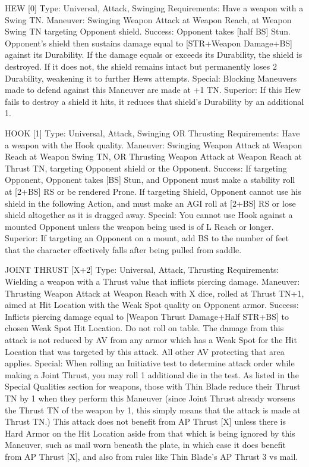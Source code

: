 \documentclass[oneside,11pt,english]{book}
\begin{document}
HEW [0] 
Type: Universal, Attack, Swinging 
Requirements: Have a weapon with a Swing TN. 
Maneuver: Swinging Weapon Attack at Weapon Reach, at Weapon Swing TN targeting Opponent shield.
Success: Opponent takes [half BS] Stun. Opponent’s shield then sustains damage equal to [STR+Weapon Damage+BS] against its Durability. If the damage equals or exceeds its Durability, the shield is destroyed. If it does not, the shield remains intact but permanently loses 2 Durability, weakening it to further Hews attempts.
Special: Blocking Maneuvers made to defend against this Maneuver are made at +1 TN. 
Superior: If this Hew fails to destroy a shield it hits, it reduces that shield’s Durability by an additional 1. 


HOOK [1] 
Type: Universal, Attack, Swinging OR Thrusting 
Requirements: Have a weapon with the Hook quality. 
Maneuver: Swinging Weapon Attack at Weapon Reach at Weapon Swing TN, OR Thrusting Weapon 
Attack at Weapon Reach at Thrust TN, targeting Opponent shield or the Opponent. 
Success: If targeting Opponent, Opponent takes [BS] Stun, and Opponent must make a stability roll at 
[2+BS] RS or be rendered Prone. 
If targeting Shield, Opponent cannot use his shield in the following Action, and must make an AGI roll at 
[2+BS] RS or lose shield altogether as it is dragged away. 
Special: You cannot use Hook against a mounted Opponent unless the weapon being used is of L Reach 
or longer. 
Superior: If targeting an Opponent on a mount, add BS to the number of feet that the character 
effectively falls after being pulled from saddle. 


JOINT THRUST [X+2] 
Type: Universal, Attack, Thrusting 
Requirements: Wielding a weapon with a Thrust value that inflicts piercing damage. 
Maneuver: Thrusting Weapon Attack at Weapon Reach with X dice, rolled at Thrust TN+1, aimed at Hit 
Location with the Weak Spot quality on Opponent armor. 
Success: Inflicts piercing damage equal to [Weapon Thrust Damage+Half STR+BS] to chosen Weak Spot 
Hit Location. Do not roll on table. The damage from this attack is not reduced by AV from any armor 
which has a Weak Spot for the Hit Location that was targeted by this attack. All other AV protecting that 
area applies. 
Special: When rolling an Initiative test to determine attack order while making a Joint Thrust, you may 
roll 1 additional die in the test. 
As listed in the Special Qualities section for weapons, those with Thin Blade reduce their Thrust TN by 1 
when they perform this Maneuver (since Joint Thrust already worsens the Thrust TN of the weapon by 1, 
this simply means that the attack is made at Thrust TN.) 
This attack does not benefit from AP Thrust [X] unless there is Hard Armor on the Hit Location aside 
from that which is being ignored by this Maneuver, such as mail worn beneath the plate, in which case it 
does benefit from AP Thrust [X], and also from rules like Thin Blade’s AP Thrust 3 vs mail. 
\end{document}
